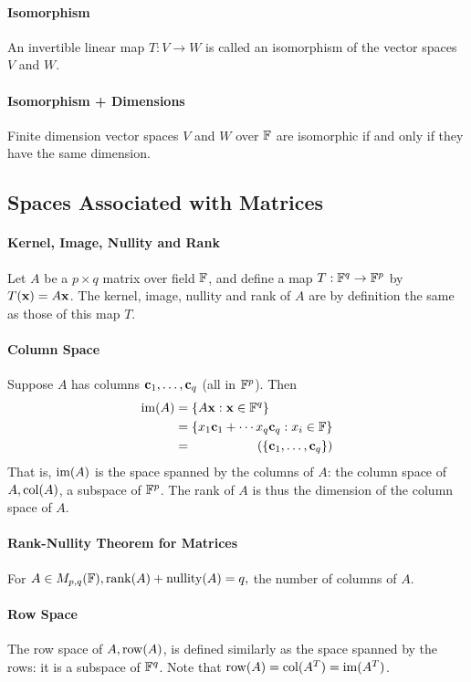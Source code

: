 \paragraph{Isomorphism}
An invertible linear map \(T: V \to W\) is called an isomorphism of the vector spaces \(V\) and \(W\). 

\paragraph{Isomorphism + Dimensions}
Finite dimension vector spaces \(V\) and \(W\) over \(\mathbb{F}\) are isomorphic if and only if they have the same dimension.

\subsection{Spaces Associated with Matrices}
\paragraph{Kernel, Image, Nullity and Rank}
Let \(A\) be a \(p \times q\) matrix over field \(\mathbb{F}\), and define a map \(T:\mathbb{F}^q \to \mathbb{F}^p\) by \(T(\mathbf{x}) = A\mathbf{x}\). The kernel, image, nullity and rank of \(A\) are by definition the same as those of this map \(T\).

\paragraph{Column Space}
Suppose \(A\) has columns \(\mathbf{c}_1, \dots, \mathbf{c}_q\) (all in \(\mathbb{F}^p\)). Then
\begin{align*}
    \im(A) & = \{A\vx : \vx \in \bF^q\} \\
    & = \{ x_1\vc_1 + \cdots x_q\vc_q : x_i \in \bF \} \\
    & = \span(\{\vc_1, \dots, \vc_q\})
\end{align*}
That is, \(\operatorname{im}(A)\) is the space spanned by the columns of \(A\): the column space of \(A, \mathrm{col}(A)\), a subspace of \(\mathbb{F}^p\). The rank of \(A\) is thus the dimension of the column space of \(A\).

\paragraph{Rank-Nullity Theorem for Matrices}
For \(A \in M_{p,q}(\mathbb{F}), \rank(A) + \mathrm{nullity}(A) = q,\) the number of columns of \(A\).

\paragraph{Row Space}
The row space of \(A, \mathrm{row}(A)\), is defined similarly as the space spanned by the rows: it is a subspace of \(\mathbb{F}^q\). Note that \(\mathrm{row}(A) = \mathrm{col}(A^T) = \operatorname{im}(A^T)\).

